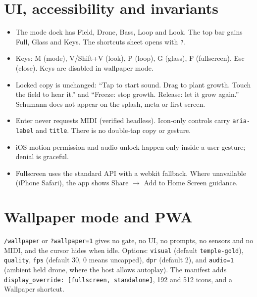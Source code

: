 \documentclass[10pt,a4paper]{article}
\newcommand{\code}[1]{\texttt{\small #1}}
\begin{document}
\section{UI, accessibility and invariants}
\begin{itemize}
\item The mode dock has Field, Drone, Bass, Loop and Look. The top bar gains Full, Glass and Keys. The shortcuts sheet opens with \code{?}.
\item Keys: M (mode), V/Shift+V (look), P (loop), G (glass), F (fullscreen), Esc (close). Keys are disabled in wallpaper mode.
\item Locked copy is unchanged: ``Tap to start sound. Drag to plant growth. Touch the field to hear it.'' and
``Freeze: stop growth. Release: let it grow again.'' Schumann does not appear on the splash, meta or first screen.
\item Enter never requests MIDI (verified headless). Icon-only controls carry \code{aria-label} and \code{title}. There is no double-tap copy or gesture.
\item iOS motion permission and audio unlock happen only inside a user gesture; denial is graceful.
\item Fullscreen uses the standard API with a webkit fallback. Where unavailable (iPhone Safari), the app shows Share $\to$ Add to Home Screen guidance.
\end{itemize}

\section{Wallpaper mode and PWA}
\code{/wallpaper} or \code{?wallpaper=1} gives no gate, no UI, no prompts, no sensors and no MIDI, and the cursor hides when idle.
Options: \code{visual} (default \code{temple-gold}), \code{quality}, \code{fps} (default 30, 0 means uncapped), \code{dpr} (default 2),
and \code{audio=1} (ambient held drone, where the host allows autoplay).
The manifest adds \code{display\_override: [fullscreen, standalone]}, 192 and 512 icons, and a Wallpaper shortcut.
\end{document}
